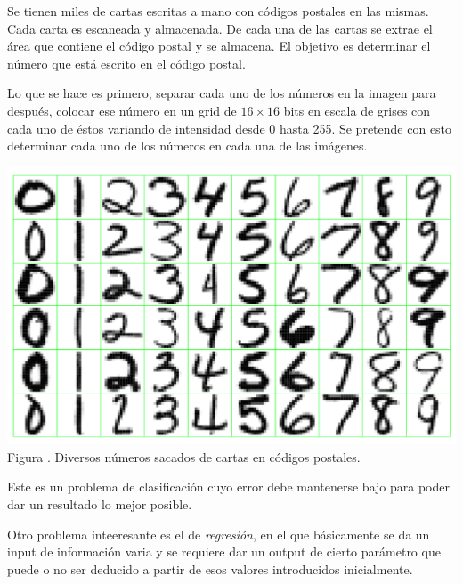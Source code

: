 \documentclass[12pt]{report}
\newcounter{it}
\theoremstyle{largebreak}
\newcounter{figcount}
\begin{document}
    \begin{excer}
        Se tienen miles de cartas escritas a mano con códigos postales en las mismas. Cada carta es escaneada y almacenada. De cada una de las cartas se extrae el área que contiene el código postal y se almacena. El objetivo es determinar el número que está escrito en el código postal.
    \end{excer}

    \begin{sol}
        Lo que se hace es primero, separar cada uno de los números en la imagen para después, colocar ese número en un grid de $16\times 16$ bits en escala de grises con cada uno de éstos variando de intensidad desde 0 hasta 255. Se pretende con esto determinar cada uno de los números en cada una de las imágenes.

        \begin{minipage}{\textwidth}
            \begin{center}
                \includegraphics[scale=0.3]{images/image_1.png}\\
                Figura \thefigcount. Diversos números sacados de cartas en códigos postales.
            \end{center}
        \end{minipage}

        Este es un problema de clasificación cuyo error debe mantenerse bajo para poder dar un resultado lo mejor posible.
    \end{sol}

    Otro problema inteeresante es el de \textit{regresión}, en el que básicamente se da un input de información varia y se requiere dar un output de cierto parámetro que puede o no ser deducido a partir de esos valores introducidos inicialmente.
\end{document}
